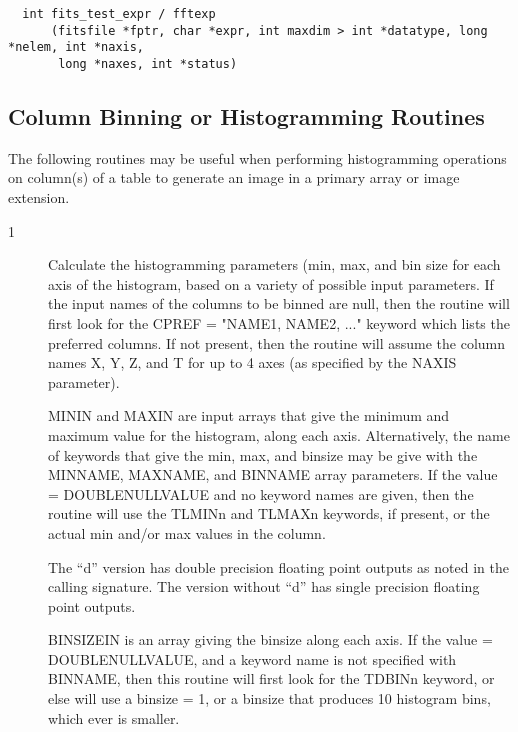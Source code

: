 \documentclass[11pt]{book}
\begin{document}
\begin{verbatim}
  int fits_test_expr / fftexp
      (fitsfile *fptr, char *expr, int maxdim > int *datatype, long *nelem, int *naxis,
       long *naxes, int *status)
\end{verbatim}


\subsection{Column Binning or Histogramming Routines}

The following routines may be useful when performing histogramming operations on
column(s) of a table to generate an image in a primary array or image extension.


\begin{description}
\item[1 ]  Calculate the histogramming parameters (min, max, and bin size
for each axis of the histogram, based on a variety of possible input parameters.
If the input names of the columns to be binned are null, then the routine will first
look for the CPREF = "NAME1, NAME2, ..." keyword which lists the preferred
columns.  If not present, then the routine will assume the column names X, Y, Z, and T
for up to 4 axes (as specified by the NAXIS parameter).

MININ and MAXIN are input arrays that give the minimum and maximum value for
the histogram, along each axis.  Alternatively, the name of keywords that give
the min, max, and binsize may be give with the MINNAME, MAXNAME, and BINNAME
array parameters.  If the value = DOUBLENULLVALUE and no keyword names are
given,  then the routine will use the TLMINn and TLMAXn keywords, if present, or the
actual min and/or max values in the column.

The ``d'' version has double precision floating point outputs as noted
in the calling signature.  The version without ``d'' has single
precision floating point outputs.

BINSIZEIN is an array giving the binsize along each axis.
If the value =
DOUBLENULLVALUE, and a keyword name is not specified with BINNAME,
then this routine will first look for the TDBINn keyword, or else will
use a binsize = 1, or a binsize that produces 10 histogram bins, which ever
is smaller.
 \label{calcbinning}
\end{description}
\end{document}

